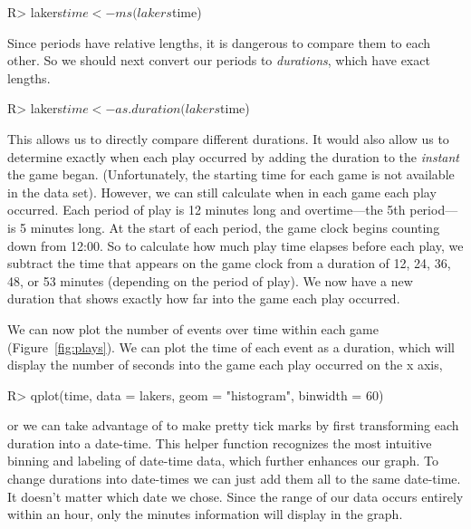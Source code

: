 \documentclass[article]{jss}
\begin{document}
\begin{CodeInput}
R> lakers$time <- ms(lakers$time)
\end{CodeInput}

Since periods have relative lengths, it is dangerous to compare them to each other. So we should next convert our periods to \emph{durations}, which have exact lengths.

\begin{CodeInput}
R> lakers$time <- as.duration(lakers$time)
\end{CodeInput}

This allows us to directly compare different durations. It would also allow us to determine exactly when each play occurred by adding the duration to the \emph{instant} the game began. (Unfortunately, the starting time for each game is not available in the data set). However, we can still calculate when in each game each play occurred. Each period of play is 12 minutes long and overtime---the 5th period---is 5 minutes long. At the start of each period, the game clock begins counting down from 12:00. So to calculate how much play time elapses before each play, we subtract the time that appears on the game clock from a duration of 12, 24, 36, 48, or 53 minutes (depending on the period of play). We now have a new duration that shows exactly how far into the game each play occurred.


We can now plot the number of events over time within each game (Figure~\ref{fig:plays}). We can plot the time of each event as a duration, which will display the number of seconds into the game each play occurred on the x axis,

\begin{CodeInput}
R> qplot(time, data = lakers, geom = "histogram", binwidth = 60)
\end{CodeInput}

or we can take advantage of  to make pretty tick marks by first transforming each duration into a date-time. This helper function recognizes the most intuitive binning and labeling of date-time data, which further enhances our graph. To change durations into date-times we can just add them all to the same date-time. It doesn't matter which date we chose. Since the range of our data occurs entirely within an hour, only the minutes information will display in the graph.
\end{document}
